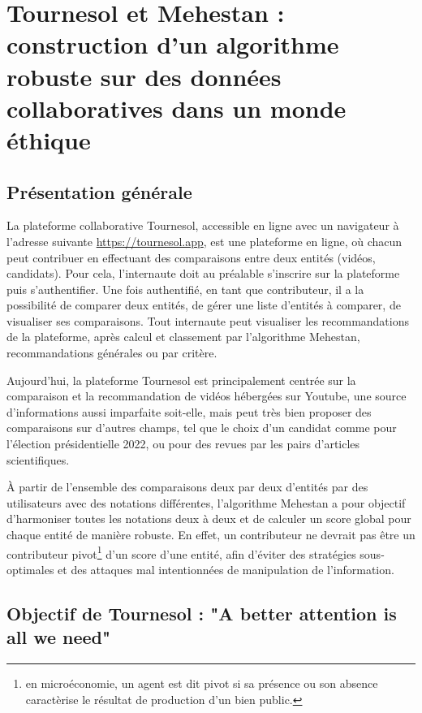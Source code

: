 \section{Tournesol et Mehestan : construction d'un algorithme robuste sur des données collaboratives dans un monde éthique}

\subsection{Présentation générale}

La plateforme collaborative Tournesol, accessible en ligne avec un navigateur à l'adresse suivante \href{https://tournesol.app}{https://tournesol.app}, est une plateforme en ligne, où chacun peut contribuer en effectuant des comparaisons entre deux entités (vidéos, candidats). Pour cela, l'internaute doit au préalable s'inscrire sur la plateforme puis s'authentifier. Une fois authentifié, en tant que contributeur, il a la possibilité de comparer deux entités, de gérer une liste d'entités à comparer, de visualiser ses comparaisons. Tout internaute peut visualiser les recommandations de la plateforme, après calcul et classement par l'algorithme Mehestan, recommandations générales ou par critère.

Aujourd'hui, la plateforme Tournesol est principalement centrée sur la comparaison et la recommandation de vidéos hébergées sur Youtube, une source d'informations aussi imparfaite soit-elle, mais peut très bien proposer des comparaisons sur d'autres champs, tel que le choix d'un candidat comme pour l'élection présidentielle 2022, ou pour des revues par les pairs d'articles scientifiques.

À partir de l'ensemble des comparaisons deux par deux d'entités par des utilisateurs avec des notations différentes, l'algorithme Mehestan a pour objectif d'harmoniser toutes les notations deux à deux et de calculer un score global pour chaque entité de manière robuste. En effet, un contributeur ne devrait pas être un contributeur pivot\footnote{en microéconomie, un agent est dit pivot si sa présence ou son absence caractèrise le résultat de production d'un bien public.} d'un score d'une entité, afin d'éviter des stratégies sous-optimales et des attaques mal intentionnées de manipulation de l'information.

\subsection{Objectif de Tournesol : "A better attention is all we need"}

